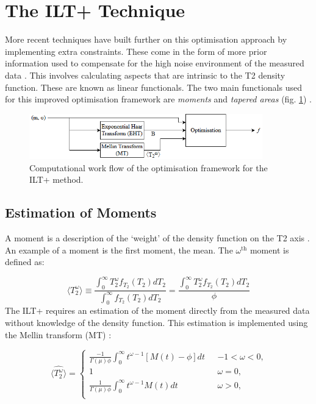 \section{The ILT+ Technique}
More recent techniques have built further on this optimisation approach by implementing extra constraints. These come in the form of more prior information used to compensate for the high noise environment of the measured data \cite{GruberT2Estimation2013}. This involves calculating aspects that are intrinsic to the T2 density function. These are known as linear functionals. The two main functionals used for this improved optimisation framework are \textit{moments} and \textit{tapered areas} (fig. \ref{fig:2013ILTXOptimisation}) \cite{GruberT2Estimation2013}.


\begin{figure}[ht!]
    \centering
    \includegraphics[width=0.9\textwidth]{ILTXBlockDiagram.png}
    \caption{Computational work flow of the optimisation framework for the ILT+ method.}
    \label{fig:2013ILTXOptimisation}
\end{figure}

\subsection{Estimation of Moments}
A moment is a description of the `weight' of the density function on the T2 axis \cite{VenkMellin2010}. An example of a moment is the first moment, the mean. The $\omega^{\text{th}}$ moment is defined as:

\begin{equation}
    \langle T_2^{\omega}  \rangle \equiv
    \frac
    {\int_{0}^{\infty}  T_2^{\omega} f_{T_2}(T_2)dT_2}
    {\int_{0}^{\infty}  f_{T_2}(T_2)dT_2 }
    =     
    \frac
    {\int_{0}^{\infty}  T_2^{\omega} f_{T_2}(T_2)dT_2}
    {\phi}
    \label{eq:defnMoment}
\end{equation}
The ILT+ requires an estimation of the moment directly from the measured data without knowledge of the density function. This estimation is implemented using the Mellin transform (MT) \cite{VenkMellin2010}:

\begin{equation}
\langle \hat{T_2^{\omega}}  \rangle =
\begin{cases}
        \frac{-1}{\Gamma (\mu) \phi}
        \int_{0}^{\infty}t^{\omega -1}[M(t) - \phi]dt &
        \text{ $-1<\omega<0$,}\\
        1 & \text{ $\omega=0$,}\\
        \frac{1}{\Gamma (\mu) \phi}
        \int_{0}^{\infty}t^{\omega -1}M(t)dt &
        \text{ $\omega>0$,}\\
\end{cases}
\label{eq:mellinTransform}
\end{equation}

